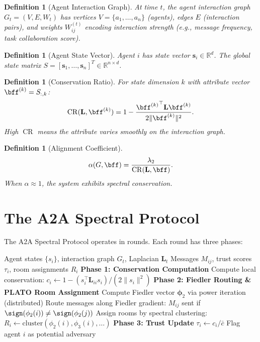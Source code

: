 \documentclass[11pt,a4paper]{article}
\newtheorem{definition}[theorem]{Definition}
\newcommand{\R}{\mathbb{R}}
\newcommand{\bL}{\mathbf{L}}
\newcommand{\bphi}{\boldsymbol{\phi}}
\DeclareMathOperator{\CR}{CR}
\begin{document}
\begin{definition}[Agent Interaction Graph]
At time $t$, the agent interaction graph $G_t = (V, E, W_t)$ has vertices
$V = \{a_1, \ldots, a_n\}$ (agents), edges $E$ (interaction pairs), and
weights $W_{ij}^{(t)}$ encoding interaction strength (e.g., message frequency,
task collaboration score).
\end{definition}

\begin{definition}[Agent State Vector]
Agent $i$ has state vector $\mathbf{s}_i \in \R^d$.  The global state matrix
$S = [\mathbf{s}_1, \ldots, \mathbf{s}_n]^T \in \R^{n \times d}$.
\end{definition}

\begin{definition}[Conservation Ratio]
For state dimension $k$ with attribute vector $\bff^{(k)} = S_{:,k}$:
\[
  \CR(\bL, \bff^{(k)}) = 1 - \frac{{\bff^{(k)}}^\top \bL \bff^{(k)}}{2 \|{\bff^{(k)}}\|^2}.
\]
High $\CR$ means the attribute varies smoothly on the interaction graph.
\end{definition}

\begin{definition}[Alignment Coefficient]
\[
  \alpha(G, \bff) = \frac{\lambda_2}{\CR(\bL, \bff)}.
\]
When $\alpha \approx 1$, the system exhibits spectral conservation.
\end{definition}

\section{The A2A Spectral Protocol}
\label{sec:protocol}

The A2A Spectral Protocol operates in rounds.  Each round has three phases:

\begin{algorithm}[ht]
\caption{A2A Spectral Protocol --- One Round}\label{alg:a2a}
\begin{algorithmic}[1]
  \Require Agent states $\{s_i\}$, interaction graph $G_t$, Laplacian $\bL_t$
  \Ensure Messages $M_{ij}$, trust scores $\tau_i$, room assignments $R_i$
  \Statex
  \Statex \textbf{Phase 1: Conservation Computation}
    \State Compute local conservation: $c_i \leftarrow 1 - (s_i^\top \bL_{ii} s_i) / (2\|s_i\|^2)$
  \EndFor
  \Statex
  \Statex \textbf{Phase 2: Fiedler Routing \& PLATO Room Assignment}
  \State Compute Fiedler vector $\bphi_2$ via power iteration (distributed)
  \State Route messages along Fiedler gradient: $M_{ij}$ sent if $\sign(\phi_2(i)) \neq \sign(\phi_2(j))$
  \State Assign rooms by spectral clustering: $R_i \leftarrow \mathrm{cluster}(\phi_2(i), \phi_3(i), \ldots)$
  \Statex
  \Statex \textbf{Phase 3: Trust Update}
    \State $\tau_i \leftarrow c_i / \bar{c}$ 
      \State Flag agent $i$ as potential adversary
    \EndIf
  \EndFor
\end{algorithmic}
\end{algorithm}
\end{document}
